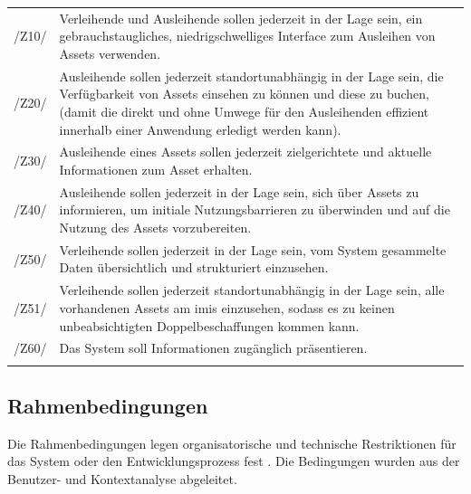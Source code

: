 \begin{center}
        \renewcommand{\arraystretch}{1.5}
        \begin{longtable}{lp{}} \arrayrulecolor{maincolor}\hline
                \sffamily\color{maincolor}/Z10/ & Verleihende und Ausleihende sollen jederzeit in
                der Lage sein, ein gebrauchstaugliches, niedrigschwelliges Interface zum Ausleihen
                von Assets verwenden. \\
                \sffamily\color{maincolor}/Z20/ & Ausleihende sollen jederzeit standortunabhängig in
                der Lage sein, die Verfügbarkeit von Assets einsehen zu können und diese zu buchen,
                (damit die direkt und ohne Umwege für den Ausleihenden effizient innerhalb einer
                Anwendung erledigt werden kann). \\
                \sffamily\color{maincolor}/Z30/ & Ausleihende eines Assets sollen jederzeit
                zielgerichtete und aktuelle Informationen zum Asset erhalten. \\
                \sffamily\color{maincolor}/Z40/ & Ausleihende sollen jederzeit in der Lage sein,
                sich über Assets zu informieren, um initiale Nutzungsbarrieren zu überwinden und auf
                die Nutzung des Assets vorzubereiten.\\
                \sffamily\color{maincolor}/Z50/ & Verleihende sollen jederzeit in der Lage sein, vom
                System gesammelte Daten übersichtlich und strukturiert einzusehen.\\
                \sffamily\color{maincolor}/Z51/ & Verleihende sollen jederzeit standortunabhängig in
                der Lage sein, alle vorhandenen Assets am \ac{imis} einzusehen, sodass es zu keinen
                unbeabsichtigten Doppelbeschaffungen kommen kann. \\
                \sffamily\color{maincolor}/Z60/ & Das System soll Informationen zugänglich
                präsentieren.\\
                \arrayrulecolor{maincolor}\hline
        \end{longtable}
\end{center}
\vspace*{-1.5cm}
\subsection{Rahmenbedingungen}
\label{section:rahmen}
Die Rahmenbedingungen legen organisatorische und technische Restriktionen für das System oder den
Entwicklungsprozess fest \cite{balzert2009}. Die Bedingungen wurden aus der Benutzer- und
Kontextanalyse abgeleitet.

